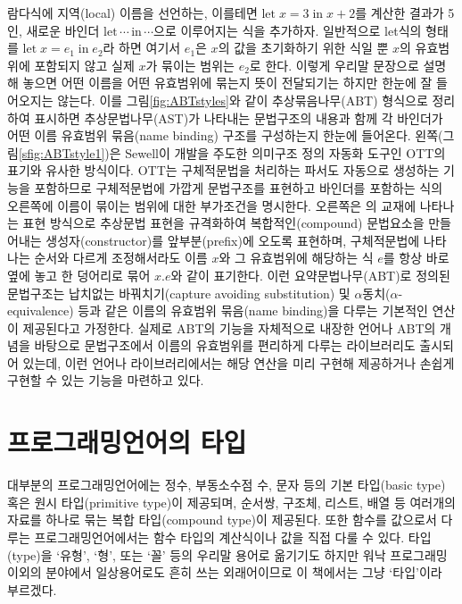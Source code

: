 람다식에 지역(local) 이름을 선언하는, 이를테면
$\textrm{let}\;x=3\;\textrm{in}\;x+2$를 계산한 결과가 5인,
새로운 바인더 $\textrm{let}\,\cdots\,\textrm{in}\,\cdots$으로
이루어지는 식을 추가하자.
일반적으로 let식의 형태를 $\textrm{let}\;x=e_1\;\textrm{in}\;e_2$라
하면 여기서 $e_1$은 $x$의 값을 초기화하기 위한 식일 뿐
$x$의 유효범위에 포함되지 않고 실제 $x$가 묶이는 범위는 $e_2$로 한다.
이렇게 우리말 문장으로 설명해 놓으면 어떤 이름을 어떤 유효범위에
묶는지 뜻이 전달되기는 하지만 한눈에 잘 들어오지는 않는다.
이를 그림\;\ref{fig:ABTstyles}와 같이 추상묶음나무(ABT) 형식으로 정리하여
표시하면 추상문법나무(AST)가 나타내는 문법구조의 내용과 함께
각 바인더가 어떤 이름 유효범위 묶음(name binding) 구조를 구성하는지
한눈에 들어온다. 왼쪽(그림\;\ref{sfig:ABTstyle1})은
Sewell\cite{Sewell2007ott}이 개발을 주도한 의미구조 정의
자동화 도구인 OTT의 표기와 유사한 방식이다.
OTT는 구체적문법을 처리하는 파서도 자동으로 생성하는 기능을
포함하므로 구체적문법에 가깝게 문법구조를 표현하고
바인더를 포함하는 식의 오른쪽에 이름이 묶이는 범위에
대한 부가조건을 명시한다. 오른쪽은 \citet{PFPL2nd}의 교재에 나타나는
표현 방식으로 추상문법 표현을 규격화하여 복합적인(compound) 문법요소을
만들어내는 생성자(constructor)를 앞부분(prefix)에 오도록 표현하며,
구체적문법에 나타나는 순서와 다르게 조정해서라도 이름 $x$와 그 유효범위에
해당하는 식 $e$를 항상 바로 옆에 놓고 한 덩어리로 묶어 $x.e$와
같이 표기한다. 이런 요약문법나무(ABT)로 정의된 문법구조는
납치없는 바꿔치기(capture avoiding substitution) 및
$\alpha$동치($\alpha$-equivalence) 등과 같은
이름의 유효범위 묶음(name binding)을 다루는 기본적인 연산이
제공된다고 가정한다. 실제로 ABT의 기능을 자체적으로 내장한
언어\cite{FreshML2003}나 ABT의 개념을 바탕으로 문법구조에서
이름의 유효범위를 편리하게 다루는 라이브러리\cite{Unbound2011}도
출시되어 있는데, 이런 언어나 라이브러리에서는 해당 연산을
미리 구현해 제공하거나 손쉽게 구현할 수 있는 기능을 마련하고 있다.

\section{프로그래밍언어의 타입}
대부분의 프로그래밍언어에는 정수, 부동소수점 수, 문자 등의
기본 타입(basic type) 혹은 원시 타입(primitive type)이 제공되며,
순서쌍, 구조체, 리스트, 배열 등 여러개의 자료를 하나로 묶는
복합 타입(compound type)이 제공된다. 또한 함수를 값으로서 다루는
프로그래밍언어에서는 함수 타입의 계산식이나 값을 직접 다룰 수 있다.
타입(type)을 `유형', `형', 또는 `꼴' 등의 우리말 용어로 옮기기도
하지만 워낙 프로그래밍 이외의 분야에서 일상용어로도 흔히 쓰는
외래어이므로 이 책에서는 그냥 `타입'이라 부르겠다.

